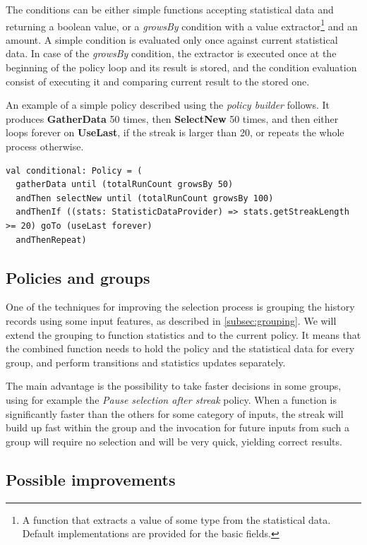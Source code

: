 The conditions can be either simple functions accepting statistical data and returning a boolean value, or a \textit{growsBy} condition with a value extractor\footnote{A function that extracts a value of some type from the statistical data. Default implementations are provided for the basic fields.} and an amount. A simple condition is evaluated only once against current statistical data. In case of the \textit{growsBy} condition, the extractor is executed once at the beginning of the policy loop and its result is stored, and the condition evaluation consist of executing it and comparing current result to the stored one.

An example of a simple policy described using the \textit{policy builder} follows. It produces \textbf{GatherData} 50 times, then \textbf{SelectNew} 50 times, and then either loops forever on \textbf{UseLast}, if the streak is larger than 20, or repeats the whole process otherwise.

\lstset{style=Scala}
\begin{lstlisting}
val conditional: Policy = (
  gatherData until (totalRunCount growsBy 50)
  andThen selectNew until (totalRunCount growsBy 100)
  andThenIf ((stats: StatisticDataProvider) => stats.getStreakLength >= 20) goTo (useLast forever)
  andThenRepeat)
\end{lstlisting}

\subsection{Policies and groups}

One of the techniques for improving the selection process is grouping the history records using some input features, as described in \ref{subsec:grouping}. We will extend the grouping to function statistics and to the current policy. It means that the combined function needs to hold the policy and the statistical data for every group, and perform transitions and statistics updates separately.

The main advantage is the possibility to take faster decisions in some groups, using for example the \textit{Pause selection after streak} policy. When a function is significantly faster than the others for some category of inputs, the streak will build up fast within the group and the invocation for future inputs from such a group will require no selection and will be very quick, yielding correct results.

\subsection{Possible improvements}
\label{subsec:policy_improvements}

